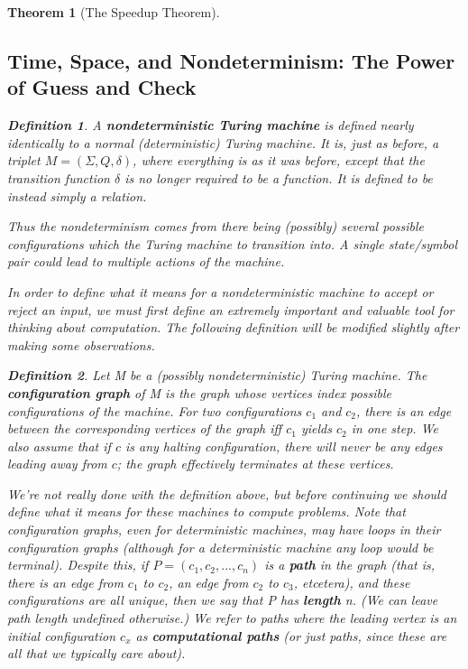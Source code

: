 \documentclass{article}
\theoremstyle{definition}
\newtheorem{definition}{Definition}[section]
\theoremstyle{plain}
\theoremstyle{theorem}
\newtheorem{theorem}{Theorem}[section]
\begin{document}
\begin{theorem}[The Speedup Theorem]
\subsection{Time, Space, and Nondeterminism: The Power of Guess and Check}
\begin{definition}
A \textbf{nondeterministic Turing machine} is defined nearly identically to a normal (deterministic) Turing machine. It is, just as before, a triplet $M=(\Sigma, Q, \delta)$, where everything is as it was before, \textit{except} that the transition function $\delta$ is no longer required to be a function. It is defined to be instead simply a relation.
\end{definition}
Thus the nondeterminism comes from there being (possibly) several possible configurations which the Turing machine to transition into. \textit{A single state/symbol pair could lead to multiple actions of the machine.}
\par In order to define what it means for a nondeterministic machine to accept or reject an input, we must first define an extremely important and valuable tool for thinking about computation. The following definition will be modified slightly after making some observations.
\begin{definition}
Let M be a (possibly nondeterministic) Turing machine. The \textbf{configuration graph} of M is the graph whose vertices index possible configurations of the machine. For two configurations $c_1$ and $c_2$, there is an edge between the corresponding vertices of the graph iff $c_1$ yields $c_2$ in one step. We also assume that if $c$ is any halting configuration, there will never be any edges leading away from $c$; the graph effectively terminates at these vertices.
\end{definition}
We're not really done with the definition above, but before continuing we should define what it means for these machines to compute problems. Note that configuration graphs, even for deterministic machines, may have loops in their configuration graphs (although for a deterministic machine any loop would be terminal). Despite this, if $P = (c_1,c_2,...,c_n)$ is a \textbf{path} in the graph (that is, there is an edge from $c_1$ to $c_2$, an edge from $c_2$ to $c_3$, etcetera), and these configurations are all unique, then we say that P has \textbf{length} n. (We can leave path length undefined otherwise.) We refer to paths where the leading vertex is an initial configuration $c_x$ as \textbf{computational paths} (or just paths, since these are all that we typically care about).

\end{theorem}
\end{document}
